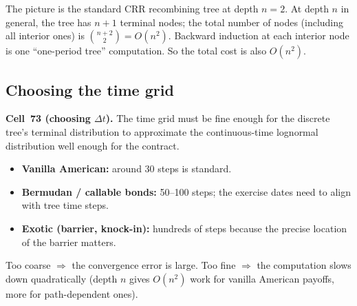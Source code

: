 \begin{center}
\end{center}

The picture is the standard CRR recombining tree at depth $n = 2$.
At depth $n$ in general, the tree has $n + 1$ terminal nodes; the
total number of nodes (including all interior ones) is $\binom{n+2}{2}
= O(n^2)$. Backward induction at each interior node is one
``one-period tree'' computation. So the total cost is also $O(n^2)$.

\subsection{Choosing the time grid}\label{L8-sec:timegrid}

\begin{keyblock}
\textbf{Cell~73 (choosing $\Delta t$).}
The time grid must be fine enough for the discrete tree's terminal
distribution to approximate the continuous-time lognormal
distribution well enough for the contract.
\begin{itemize}
  \item \textbf{Vanilla American:} around 30 steps is standard.
  \item \textbf{Bermudan / callable bonds:} 50--100 steps; the
        exercise dates need to align with tree time steps.
  \item \textbf{Exotic (barrier, knock-in):} hundreds of steps
        because the precise location of the barrier matters.
\end{itemize}
Too coarse $\Rightarrow$ the convergence error is large. Too fine
$\Rightarrow$ the computation slows down quadratically (depth $n$
gives $O(n^2)$ work for vanilla American payoffs, more for
path-dependent ones).
\end{keyblock}

